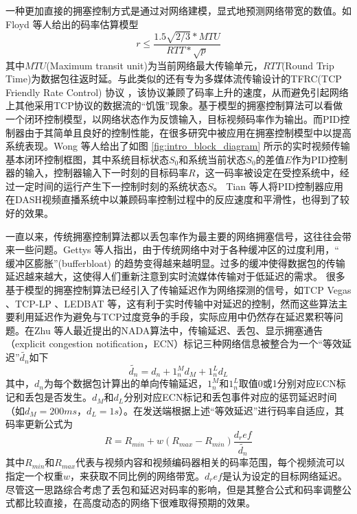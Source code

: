 一种更加直接的拥塞控制方式是通过对网络建模，显式地预测网络带宽的数值。如Floyd \cite{floyd1999promoting} 等人给出的码率估算模型
\begin{equation}
  r \le \frac{1.5\sqrt{2/3} * MTU}{RTT * \sqrt{p}}
\end{equation}
其中$MTU$(Maximum transit unit)为当前网络最大传输单元，$RTT$(Round Trip Time)为数据包往返时延。与此类似的还有专为多媒体流传输设计的TFRC(TCP Friendly Rate Control) 协议 \cite{handley2003tcp}，该协议兼顾了码率上升的速度，从而避免引起网络上其他采用TCP协议的数据流的``饥饿''现象。基于模型的拥塞控制算法可以看做一个闭环控制模型，以网络状态作为反馈输入，目标视频码率作为输出。而PID控制器由于其简单且良好的控制性能，在很多研究中被应用在拥塞控制模型中以提高系统表现。Wong \cite{wong2004pid} 等人给出了如图 \ref{fig:intro_block_diagram} 所示的实时视频传输基本闭环控制框图，其中系统目标状态$S_0$和系统当前状态$S_0$的差值$E$作为PID控制器的输入，控制器输入下一时刻的目标码率$R$，这一码率被设定在受控系统中，经过一定时间的运行产生下一控制时刻的系统状态$S$。
Tian \cite{tian2012towards} 等人将PID控制器应用在DASH视频直播系统中以兼顾码率控制过程中的反应速度和平滑性，也得到了较好的效果。


一直以来，传统拥塞控制算法都以丢包率作为最主要的网络拥塞信号，这往往会带来一些问题。Gettys \cite{gettys2012bufferbloat} 等人指出，由于传统网络中对于各种缓冲区的过度利用，`` 缓冲区膨胀''(bufferbloat) 的趋势变得越来越明显。过多的缓冲使得数据包的传输延迟越来越大，这使得人们重新注意到实时流媒体传输对于低延迟的需求。
很多基于模型的拥塞控制算法已经引入了传输延迟作为网络探测的信号，如TCP Vegas \cite{brakmo1995tcp} 、TCP-LP \cite{kuzmanovic2003tcp}、LEDBAT \cite{shalunov2012low}等，这有利于实时传输中对延迟的控制，然而这些算法主要利用延迟作为避免与TCP过度竞争的手段，实际应用中仍然存在延迟累积等问题。在Zhu \cite{zhu2013nada} 等人最近提出的NADA算法中，传输延迟、丢包、显示拥塞通告（explicit congestion notification，ECN）标记三种网络信息被整合为一个``等效延迟''$\widetilde{d_n}$如下
\begin{equation}
  \widetilde{d_n} = d_n + 1_n^M d_M + 1_n^L d_L
\end{equation}
其中，$d_n$为每个数据包计算出的单向传输延迟，$1_n^M$和$1_n^L$取值0或1分别对应ECN标记和丢包是否发生。$d_M$和$d_L$分别对应ECN标记和丢包事件对应的惩罚延迟时间（如$d_M=200ms$，$d_L=1s$）。在发送端根据上述``等效延迟''进行码率自适应，其码率更新公式为
\begin{equation}
  R = R_{min} + w(R_{max} - R_{min}) \frac{d_ref}{\widetilde{d_n}}
\end{equation}
其中$R_{min}$和$R_{max}$代表与视频内容和视频编码器相关的码率范围，每个视频流可以指定一个权重$w$，来获取不同比例的网络带宽。$d_ref$是认为设定的目标网络延迟。
尽管这一思路综合考虑了丢包和延迟对码率的影响，但是其整合公式和码率调整公式都比较直接，在高度动态的网络下很难取得预期的效果。

